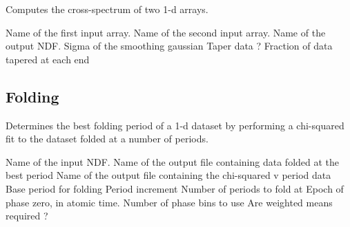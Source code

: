 
\begin{manroutinedescription}

Computes the cross-spectrum of two 1-d arrays. 

\begin{manparametertable}
   Name of the first input array.
   Name of the second input array.
   Name of the output NDF.
   Sigma of the smoothing gaussian
   Taper data ?
   Fraction of data tapered at each end
\end{manparametertable}

\end{manroutinedescription}

\newpage

\subsection{Folding}


\begin{manroutinedescription}

Determines the best folding period of a 1-d dataset by performing
a chi-squared fit to the dataset folded at a number of periods.

\begin{manparametertable}
   Name of the input NDF.
   Name of the output file containing data folded at the best period
   Name of the output file containing the chi-squared v period data
   Base period for folding
   Period increment
   Number of periods to fold at
   Epoch of phase zero, in atomic time.
   Number of phase bins to use
   Are weighted means required ?
\end{manparametertable}

\end{manroutinedescription}

